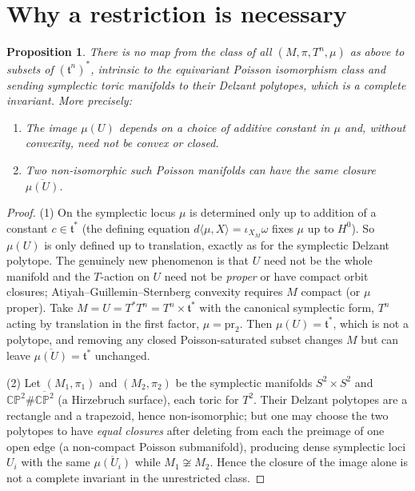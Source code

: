 \documentclass{amsart}
\newtheorem{proposition}{Proposition}
\theoremstyle{definition}
\begin{document}
\section{Why a restriction is necessary}\label{sec:scope}

\begin{proposition}\label{prop:noinvariant}
There is no map from the class of all $(M,\pi,T^n,\mu)$ as above to subsets of
$(\mathfrak t^n)^*$, intrinsic to the equivariant Poisson isomorphism class and
sending symplectic toric manifolds to their Delzant polytopes, which is a
complete invariant. More precisely:
\begin{enumerate}
\item The image $\mu(U)$ depends on a choice of additive constant in $\mu$ and,
without convexity, need not be convex or closed.
\item Two non-isomorphic such Poisson manifolds can have the same closure
$\overline{\mu(U)}$.
\end{enumerate}
\end{proposition}

\begin{proof}
(1) On the symplectic locus $\mu$ is determined only up to addition of a
constant $c\in\mathfrak t^*$ (the defining equation $d\langle\mu,X\rangle=
\iota_{X_M}\omega$ fixes $\mu$ up to $H^0$). So $\mu(U)$ is only defined up to
translation, exactly as for the symplectic Delzant polytope. The genuinely new
phenomenon is that $U$ need not be the whole manifold and the $T$-action on
$U$ need not be \emph{proper} or have compact orbit closures; Atiyah--Guillemin--Sternberg
convexity requires $M$ compact (or $\mu$ proper). Take $M=U=T^*\!T^n=
T^n\times\mathfrak t^*$ with the canonical symplectic form, $T^n$ acting by
translation in the first factor, $\mu=\mathrm{pr}_2$. Then $\mu(U)=\mathfrak
t^*$, which is not a polytope, and removing any closed Poisson-saturated subset
changes $M$ but can leave $\overline{\mu(U)}=\mathfrak t^*$ unchanged.

(2) Let $(M_1,\pi_1)$ and $(M_2,\pi_2)$ be the symplectic manifolds
$S^2\times S^2$ and $\mathbb{CP}^2\#\overline{\mathbb{CP}^2}$ (a Hirzebruch
surface), each toric for $T^2$. Their Delzant polytopes are a rectangle and a
trapezoid, hence non-isomorphic; but one may choose the two polytopes to have
\emph{equal closures} after deleting from each the preimage of one open edge
(a non-compact Poisson submanifold), producing dense symplectic loci $U_i$ with
the same $\overline{\mu(U_i)}$ while $M_1\not\cong M_2$. Hence the closure of
the image alone is not a complete invariant in the unrestricted class.
\end{proof}
\end{document}
